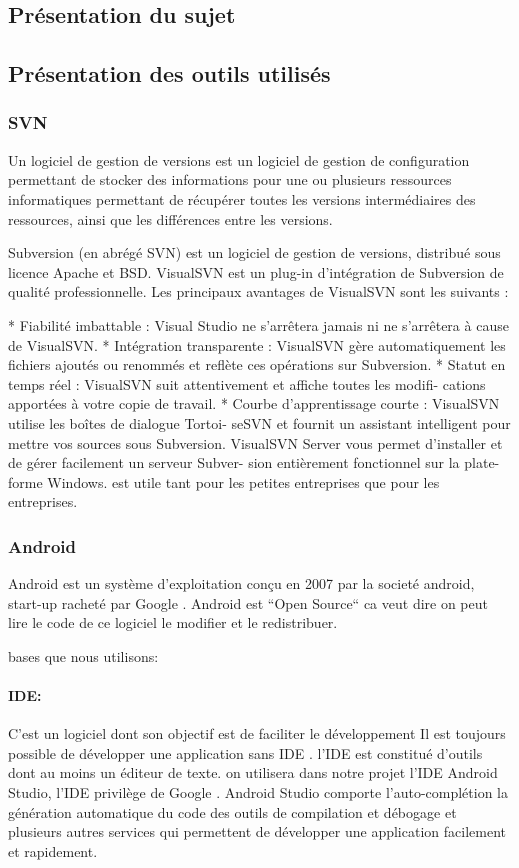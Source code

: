 \subsection{Présentation du sujet}

\subsection{Présentation des outils utilisés}
\subsubsection{SVN}
Un logiciel de gestion de versions est un logiciel de gestion
de configuration permettant
de stocker des informations pour une ou plusieurs ressources
informatiques permettant de
récupérer toutes les versions intermédiaires des ressources,
ainsi que les différences entre
les versions.


Subversion (en abrégé SVN) est un logiciel de gestion de versions, distribué sous licence
Apache et BSD.
VisualSVN est un plug-in d’intégration de Subversion de qualité professionnelle. Les
principaux avantages de VisualSVN sont les suivants :

* Fiabilité imbattable : Visual Studio ne s’arrêtera jamais ni ne s’arrêtera à cause
de VisualSVN.
* Intégration transparente : VisualSVN gère automatiquement les fichiers ajoutés
ou renommés et reflète ces opérations sur Subversion.
* Statut en temps réel : VisualSVN suit attentivement et affiche toutes les modifi-
cations apportées à votre copie de travail.
* Courbe d’apprentissage courte : VisualSVN utilise les boîtes de dialogue Tortoi-
seSVN et fournit un assistant intelligent pour mettre vos sources sous Subversion.
VisualSVN Server vous permet d’installer et de gérer facilement un serveur Subver-
sion entièrement fonctionnel sur la plate-forme Windows. est utile tant pour les petites
entreprises que pour les entreprises.
\subsubsection{Android}
Android est un système d'exploitation conçu en 2007 par la societé android,
start-up racheté par Google . Android est ``Open Source`` ca veut dire on peut
lire le code de ce logiciel le modifier et le redistribuer.

bases que nous utilisons:
\paragraph{IDE:}
C'est un logiciel dont son objectif est de faciliter le développement 
Il est toujours possible de développer une application sans IDE . 
l'IDE est constitué d'outils dont au moins un éditeur de texte. 
on utilisera dans notre projet l'IDE Android Studio, l'IDE privilège 
de Google . Android Studio comporte l'auto-complétion la génération
automatique  du code des outils de compilation et débogage et plusieurs
autres services qui permettent de développer une application facilement et
rapidement.
